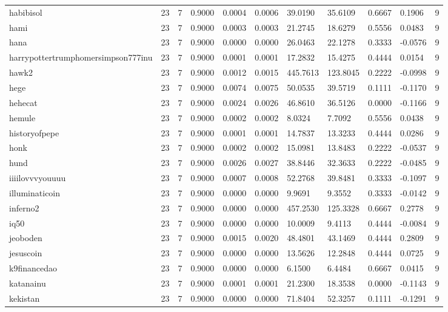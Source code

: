 \begin{table}[htbp]
\begin{tabular}{lllllllllll}
habibisol & 23 & 7 & 0.9000 & 0.0004 & 0.0006 & 39.0190 & 35.6109 & 0.6667 & 0.1906 & 9 \\
hami & 23 & 7 & 0.9000 & 0.0003 & 0.0003 & 21.2745 & 18.6279 & 0.5556 & 0.0483 & 9 \\
hana & 23 & 7 & 0.9000 & 0.0000 & 0.0000 & 26.0463 & 22.1278 & 0.3333 & -0.0576 & 9 \\
harrypottertrumphomersimpson777inu & 23 & 7 & 0.9000 & 0.0001 & 0.0001 & 17.2832 & 15.4275 & 0.4444 & 0.0154 & 9 \\
hawk2 & 23 & 7 & 0.9000 & 0.0012 & 0.0015 & 445.7613 & 123.8045 & 0.2222 & -0.0998 & 9 \\
hege & 23 & 7 & 0.9000 & 0.0074 & 0.0075 & 50.0535 & 39.5719 & 0.1111 & -0.1170 & 9 \\
hehecat & 23 & 7 & 0.9000 & 0.0024 & 0.0026 & 46.8610 & 36.5126 & 0.0000 & -0.1166 & 9 \\
hemule & 23 & 7 & 0.9000 & 0.0002 & 0.0002 & 8.0324 & 7.7092 & 0.5556 & 0.0438 & 9 \\
historyofpepe & 23 & 7 & 0.9000 & 0.0001 & 0.0001 & 14.7837 & 13.3233 & 0.4444 & 0.0286 & 9 \\
honk & 23 & 7 & 0.9000 & 0.0002 & 0.0002 & 15.0981 & 13.8483 & 0.2222 & -0.0537 & 9 \\
hund & 23 & 7 & 0.9000 & 0.0026 & 0.0027 & 38.8446 & 32.3633 & 0.2222 & -0.0485 & 9 \\
iiiilovvvyouuuu & 23 & 7 & 0.9000 & 0.0007 & 0.0008 & 52.2768 & 39.8481 & 0.3333 & -0.1097 & 9 \\
illuminaticoin & 23 & 7 & 0.9000 & 0.0000 & 0.0000 & 9.9691 & 9.3552 & 0.3333 & -0.0142 & 9 \\
inferno2 & 23 & 7 & 0.9000 & 0.0000 & 0.0000 & 457.2530 & 125.3328 & 0.6667 & 0.2778 & 9 \\
iq50 & 23 & 7 & 0.9000 & 0.0000 & 0.0000 & 10.0009 & 9.4113 & 0.4444 & -0.0084 & 9 \\
jeoboden & 23 & 7 & 0.9000 & 0.0015 & 0.0020 & 48.4801 & 43.1469 & 0.4444 & 0.2809 & 9 \\
jesuscoin & 23 & 7 & 0.9000 & 0.0000 & 0.0000 & 13.5626 & 12.2848 & 0.4444 & 0.0725 & 9 \\
k9financedao & 23 & 7 & 0.9000 & 0.0000 & 0.0000 & 6.1500 & 6.4484 & 0.6667 & 0.0415 & 9 \\
katanainu & 23 & 7 & 0.9000 & 0.0001 & 0.0001 & 21.2300 & 18.3538 & 0.0000 & -0.1143 & 9 \\
kekistan & 23 & 7 & 0.9000 & 0.0000 & 0.0000 & 71.8404 & 52.3257 & 0.1111 & -0.1291 & 9 \\

\end{tabular}
\end{table}
